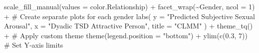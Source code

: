 \documentclass[
  bookmarksnumbered]{article}
\newenvironment{Shaded}{\begin{snugshade}}{\end{snugshade}}
\newcommand{\AttributeTok}[1]{\textcolor[rgb]{0.80,0.80,0.80}{#1}}
\newcommand{\CommentTok}[1]{\textcolor[rgb]{0.50,0.62,0.50}{#1}}
\newcommand{\DecValTok}[1]{\textcolor[rgb]{0.86,0.86,0.80}{#1}}
\newcommand{\FloatTok}[1]{\textcolor[rgb]{0.75,0.75,0.82}{#1}}
\newcommand{\FunctionTok}[1]{\textcolor[rgb]{0.94,0.94,0.56}{#1}}
\newcommand{\NormalTok}[1]{\textcolor[rgb]{0.80,0.80,0.80}{#1}}
\newcommand{\SpecialCharTok}[1]{\textcolor[rgb]{0.86,0.64,0.64}{#1}}
\newcommand{\StringTok}[1]{\textcolor[rgb]{0.80,0.58,0.58}{#1}}
\begin{document}
\begin{Shaded}
\begin{Highlighting}[]
  \FunctionTok{scale\_fill\_manual}\NormalTok{(}\AttributeTok{values =}\NormalTok{ color.Relationship) }\SpecialCharTok{+}
  \FunctionTok{facet\_wrap}\NormalTok{(}\SpecialCharTok{\textasciitilde{}}\NormalTok{Gender, }\AttributeTok{ncol =} \DecValTok{1}\NormalTok{) }\SpecialCharTok{+} \CommentTok{\# Create separate plots for each gender}
  \FunctionTok{labs}\NormalTok{(}
    \AttributeTok{y =} \StringTok{"Predicted Subjective Sexual Arousal"}\NormalTok{, }\AttributeTok{x =} \StringTok{"Dyadic TSD Attractive Person"}\NormalTok{,}
    \AttributeTok{title =} \StringTok{"CLMM"}
\NormalTok{  ) }\SpecialCharTok{+}
  \FunctionTok{theme\_tq}\NormalTok{() }\SpecialCharTok{+} \CommentTok{\# Apply custom theme}
  \FunctionTok{theme}\NormalTok{(}\AttributeTok{legend.position =} \StringTok{"bottom"}\NormalTok{) }\SpecialCharTok{+}
  \FunctionTok{ylim}\NormalTok{(}\FunctionTok{c}\NormalTok{(}\FloatTok{0.3}\NormalTok{, }\DecValTok{7}\NormalTok{)) }\CommentTok{\# Set Y{-}axis limits}


\end{Highlighting}
\end{Shaded}
\end{document}
